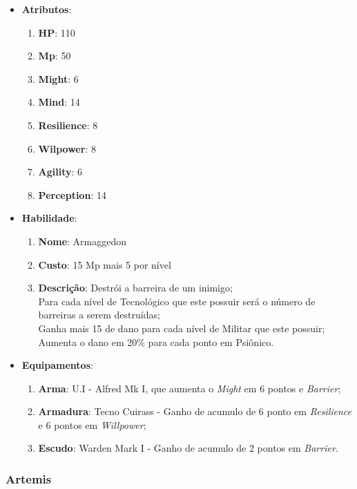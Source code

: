 \documentclass[11pt]{article} %
\begin{document}
\begin{itemize}
\item \textbf{Atributos}:
  \begin{enumerate}
    \item \textbf{HP}: 110
    \item \textbf{Mp}: 50
    \item \textbf{Might}: 6
    \item \textbf{Mind}: 14
    \item \textbf{Resilience}: 8
    \item \textbf{Wilpower}: 8
    \item \textbf{Agility}: 6
    \item \textbf{Perception}: 14
  \end{enumerate}
\item \textbf{Habilidade}:
  \begin{enumerate}
    \item \textbf{Nome}: Armaggedon
    \item \textbf{Custo}: 15 Mp mais 5 por nível
    \item \textbf{Descrição}: Destrói a barreira de um inimigo;\\
    Para cada nível de Tecnológico que este possuir será o número de barreiras a serem destruídas;\\
    Ganha mais 15 de dano para cada nível de Militar que este possuir;\\
    Aumenta o dano em 20\% para cada ponto em Psiônico.
  \end{enumerate}
\item \textbf{Equipamentos}:
  \begin{enumerate}
    \item \textbf{Arma}: U.I - Alfred Mk I, que aumenta o \textit{Might} em 6 pontos e \textit{Barrier};
    \item \textbf{Armadura}: Tecno Cuirass - Ganho de acumulo de 6 ponto em \textit{Resilience} e 6 pontos em \textit{Willpower};
    \item \textbf{Escudo}: Warden Mark I - Ganho de acumulo de 2 pontos em \textit{Barrier}.
  \end{enumerate}
\end{itemize}

\subsubsection{Artemis}
\end{document}
